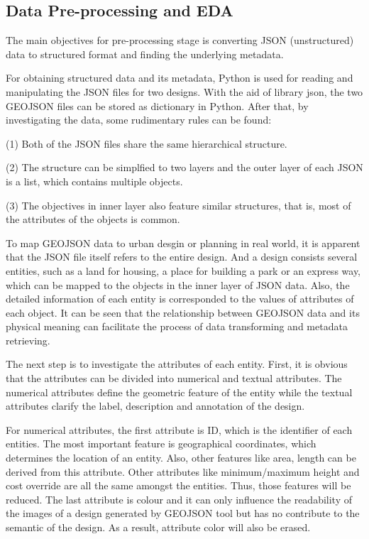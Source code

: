 \subsection*{Data Pre-processing and EDA}
The main objectives for pre-processing stage is converting JSON (unstructured) data to structured format and finding the underlying metadata.
\par
For obtaining structured data and its metadata, Python is used for reading and manipulating the JSON files for two designs. With the aid of library json, the two GEOJSON files can be stored as dictionary in Python. After that, by investigating the data, some rudimentary rules can be found:
\par
(1) Both of the JSON files share the same hierarchical structure.
\par
(2) The structure can be simplfied to two layers and the outer layer of each JSON is a list, which contains multiple objects.
\par
(3) The objectives in inner layer also feature similar structures, that is, most of the attributes of the objects is common.
\par
To map GEOJSON data to urban desgin or planning in real world, it is apparent that the JSON file itself refers to the entire design. And a design consists several entities, such as a land for housing, a place for building a park or an express way, which can be mapped to the objects in the inner layer of JSON data. Also, the detailed information of each entity is corresponded to the values of attributes of each object. It can be seen that the relationship between GEOJSON data and its physical meaning can facilitate the process of data transforming and metadata retrieving.
\par
The next step is to investigate the attributes of each entity. First, it is obvious that the attributes can be divided into numerical and textual attributes. The numerical attributes define the geometric feature of the entity while the textual attributes clarify the label, description and annotation of the design.
\par
For numerical attributes, the first attribute is ID, which is the identifier of each entities. The most important feature is geographical coordinates, which determines the location of an entity. Also, other features like area, length can be derived from this attribute. Other attributes like minimum/maximum height and cost override are all the same amongst the entities. Thus, those features will be reduced. The last attribute is colour and it can only influence the readability of the images of a design generated by GEOJSON tool but has no contribute to the semantic of the design. As a result, attribute color will also be erased.
